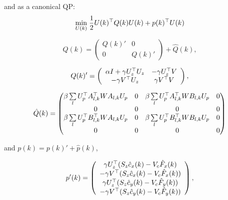 and as a canonical QP:
\begin{equation*}
\underset{U(k)}{\min} \; \dfrac{1}{2} U(k)^{\top} Q(k) U(k) + p(k)^{\top} U(k)
\end{equation*}

\begin{equation*}
Q(k) = \left( \begin{array}{cc}
Q(k)' & 0 \\
0 & Q(k)'
\end{array}
 \right) + \hat{Q}(k),
\end{equation*}

\begin{equation*}
 Q(k)' = \left(
 \begin{array}{cc}
 \alpha I + \gamma U^{\top}_{z}U_{z} & - \gamma U^{\top}_{z}V \\
 -\gamma V^{\top} U_{z} & \gamma V^{\top} V
 \end{array}
 \right),
\end{equation*}

\begin{equation*}
 \hat{Q}(k) = \left(
 \begin{matrix}
 \beta \sum\limits_l U_{p}^{\top} A_{l,k}^{\top} {W} A_{l,k} U_{p} & 0 & \beta \sum\limits_l U_{p}^{\top} A_{l,k}^{\top} {W} B_{l,k} U_{p} & 0\\
 0 & 0 & 0 & 0 \\
 \beta \sum\limits_l U_{p}^{\top} B_{l,k}^{\top} {W} A_{l,k} U_{p} & 0 & \beta \sum\limits_l U_{p}^{\top} B_{l,k}^{\top} {W} B_{l,k} U_{p} & 0 \\
 0 & 0 & 0 & 0
 \end{matrix}
 \right)
\end{equation*}

and $p(k) = p(k)' + \hat{p}(k)$,

\begin{equation*}
 p'(k) = 
 \left(
 \begin{array}{c}
 \gamma U^{\top}_{z}(S_{z} \hat{c}_x(k) - V_c \hat{F}_x(k) \\
 -\gamma V^{\top}(S_{z}\hat{c}_x(k) - V_c \hat{F}_x(k) ) \\
 \gamma U^{\top}_{z}(S_{z} \hat{c}_y(k) - V_c \hat{F}_y(k) ) \\
 -\gamma V^{\top} (S_{z}\hat{c}_y(k) - V_c \hat{F}_y(k) )
 \end{array}
 \right),
\end{equation*}

